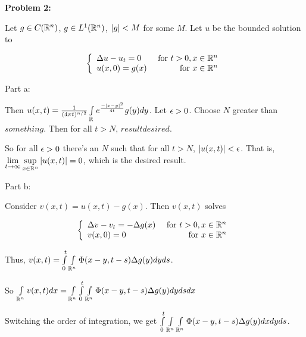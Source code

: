 \documentclass[a4paper,12pt]{article}
\begin{document}


\shunt

{\bf Problem 2:}

Let $g \in C(\mathbb{R}^n)$, $g \in L^1(\mathbb{R}^n)$, $\left\lvert g \right\rvert < M$ for some $M$. Let $u$ be the bounded solution to 

\begin{displaymath}
   \left\{
     \begin{array}{lr}
       \Delta u -u_t  = 0 & \text{ for } t>0, x \in \mathbb{R}^n \\
       u(x,0) = g(x) & \text{ for } x \in \mathbb{R}^n
     \end{array}
   \right.
\end{displaymath}

Part a:

Then $u(x,t) = \frac{1}{(4\pi t)^{n/2}}\int\limits_{\mathbb{R}} e^{\frac{-\left\lvert x-y \right\rvert^2}{4t}} g(y) dy$. Let $\epsilon >0$. Choose $N$ greater than $something$. Then for all $t >N$, $result desired$. %

So for all $\epsilon>0$ there's an $N$ such that for all $t>N$, $\left\lvert u(x,t) \right\rvert < \epsilon$. That is, $\lim\limits_{t \to \infty} \sup\limits_{x \in \mathbb{R}^n} \left\lvert u(x,t) \right\rvert = 0$, which is the desired result.

\shunt

Part b:

Consider $v(x,t) = u(x,t) - g(x)$. Then $v(x,t)$ solves

\begin{displaymath}
   \left\{
     \begin{array}{lr}
       \Delta v -v_t  = -\Delta g(x) & \text{ for } t>0, x \in \mathbb{R}^n \\
       v(x,0) = 0 & \text{ for } x \in \mathbb{R}^n
     \end{array}
   \right.
\end{displaymath}

Thus, $v(x,t) = \int\limits_0^t \int\limits_{\mathbb{R}^n} \Phi(x-y,t-s) \Delta g(y) dy ds$.

So $\int\limits_{\mathbb{R}^n} v(x,t) dx = \int\limits_{\mathbb{R}^n} \int\limits_0^t \int\limits_{\mathbb{R}^n} \Phi(x-y,t-s) \Delta g(y) dy ds dx$

Switching the order of integration, we get $ \int\limits_0^t \int\limits_{\mathbb{R}^n} \int\limits_{\mathbb{R}^n} \Phi(x-y,t-s) \Delta g(y) dx dy ds$.
\end{document}
